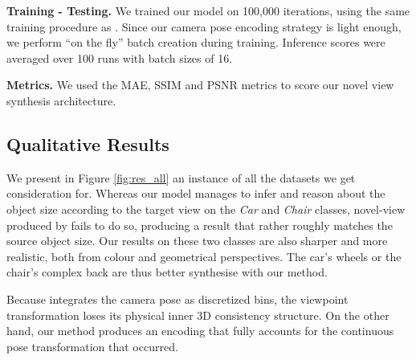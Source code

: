 \noindent\textbf{Training - Testing.} We trained our model on 100,000 iterations, using the same training procedure as \citep{kim2020novel}. Since our camera pose encoding strategy is light enough, we perform ``on the fly'' batch creation during training. Inference scores were averaged over 100 runs with batch sizes of 16. \newline


\noindent\textbf{Metrics.} We used the \ac{MAE},  \ac{SSIM} \citep{wang2004image} and \ac{PSNR} metrics to score our novel view synthesis architecture. 

\subsection{Qualitative Results}

We present in Figure \ref{fig:res_all} an instance of all the datasets we get consideration for. Whereas our model manages to infer and reason about the object size according to the target view on the \textit{Car} and \textit{Chair} classes, novel-view produced by \citep{kim2020novel} fails to do so, producing a result that rather roughly matches the source object size. Our results on these two classes are also sharper and more realistic, both from colour and geometrical perspectives. The car's wheels or the chair's complex back are thus better synthesise with our method. 

Because \citep{kim2020novel} integrates the camera pose as discretized bins, the viewpoint transformation loses its physical inner 3D consistency structure. On the other hand, our method produces an encoding that fully accounts for the continuous pose transformation that occurred.\newline


